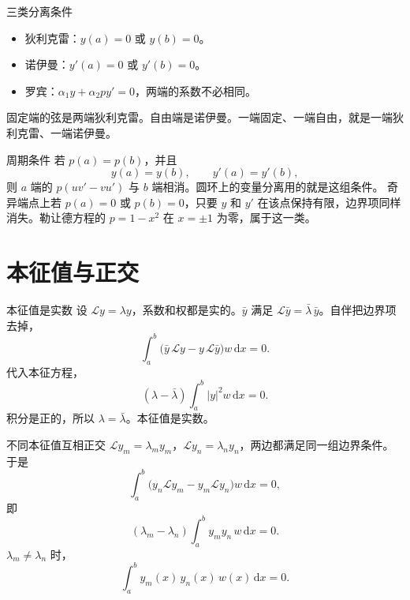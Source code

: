 \documentclass[fontset=windows, chinese, 10pt, xcolor=dvipsnames]{beamer}
\begin{document}
\begin{frame}{三类分离条件}
  \begin{itemize}
    \item 狄利克雷：$y(a)=0$ 或 $y(b)=0$。
    \item 诺伊曼：$y'(a)=0$ 或 $y'(b)=0$。
    \item 罗宾：$\alpha_1 y+\alpha_2 p y'=0$，两端的系数不必相同。
  \end{itemize}
  \vspace{0.35em}
  固定端的弦是两端狄利克雷。自由端是诺伊曼。一端固定、一端自由，就是一端狄利克雷、一端诺伊曼。
\end{frame}

\begin{frame}{周期条件}
  若 $p(a)=p(b)$，并且
  \[
    y(a)=y(b),\qquad y'(a)=y'(b),
  \]
  则 $a$ 端的 $p(uv'-vu')$ 与 $b$ 端相消。圆环上的变量分离用的就是这组条件。
  \vspace{0.4em}
  奇异端点上若 $p(a)=0$ 或 $p(b)=0$，只要 $y$ 和 $y'$ 在该点保持有限，边界项同样消失。勒让德方程的 $p=1-x^2$ 在 $x=\pm 1$ 为零，属于这一类。
\end{frame}

\section{本征值与正交}

\begin{frame}{本征值是实数}
  设 $\mathcal{L}y=\lambda y$，系数和权都是实的。$\bar y$ 满足 $\mathcal{L}\bar y=\bar\lambda\,\bar y$。自伴把边界项去掉，
  \[
    \int_a^b\bigl(\bar y\,\mathcal{L}y-y\,\mathcal{L}\bar y\bigr)w\,\mathrm{d}x=0.
  \]
  代入本征方程，
  \[
    (\lambda-\bar\lambda)\int_a^b |y|^2 w\,\mathrm{d}x=0.
  \]
  积分是正的，所以 $\lambda=\bar\lambda$。本征值是实数。
\end{frame}

\begin{frame}{不同本征值互相正交}
  $\mathcal{L}y_m=\lambda_m y_m$，$\mathcal{L}y_n=\lambda_n y_n$，两边都满足同一组边界条件。于是
  \[
    \int_a^b\bigl(y_n\mathcal{L}y_m-y_m\mathcal{L}y_n\bigr)w\,\mathrm{d}x=0,
  \]
  即
  \[
    (\lambda_m-\lambda_n)\int_a^b y_m y_n\,w\,\mathrm{d}x=0.
  \]
  $\lambda_m\neq\lambda_n$ 时，
  \begin{equation*}
    \boxed{\displaystyle
      \int_a^b y_m(x)\,y_n(x)\,w(x)\,\mathrm{d}x=0.}
  \end{equation*}
\end{frame}
\end{document}
